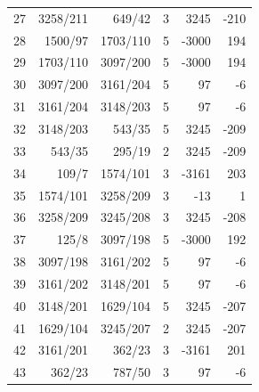 \documentclass[11pt,a4paper]{article}
\begin{document}
\begin{minipage}[t]{.49\linewidth}
\begin{tabular*}{\linewidth}{@{}r@{\extracolsep{\fill}}rrrrr@{}}
27 & 3258/211 & 649/42 & 3 & 3245 & -210\\
28 & 1500/97 & 1703/110 & 5 & -3000 & 194\\
29 & 1703/110 & 3097/200 & 5 & -3000 & 194\\
30 & 3097/200 & 3161/204 & 5 & 97 & -6\\
31 & 3161/204 & 3148/203 & 5 & 97 & -6\\
32 & 3148/203 & 543/35 & 5 & 3245 & -209\\
33 & 543/35 & 295/19 & 2 & 3245 & -209\\
34 & 109/7 & 1574/101 & 3 & -3161 & 203\\
35 & 1574/101 & 3258/209 & 3 & -13 & 1\\
36 & 3258/209 & 3245/208 & 3 & 3245 & -208\\
37 & 125/8 & 3097/198 & 5 & -3000 & 192\\
38 & 3097/198 & 3161/202 & 5 & 97 & -6\\
39 & 3161/202 & 3148/201 & 5 & 97 & -6\\
40 & 3148/201 & 1629/104 & 5 & 3245 & -207\\
41 & 1629/104 & 3245/207 & 2 & 3245 & -207\\
42 & 3161/201 & 362/23 & 3 & -3161 & 201\\
43 & 362/23 & 787/50 & 3 & 97 & -6\\
\bottomrule\end{tabular*}\end{minipage}\hfill
\end{document}
